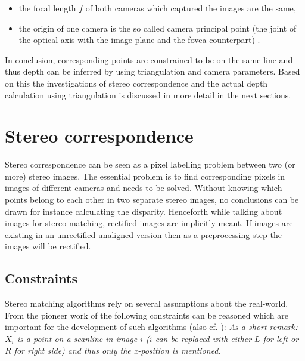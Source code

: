 \begin{itemize}
  \item the focal length $f$ of both cameras which captured the images are the same,
  \item the origin of one camera is the so called camera principal point (the joint of the optical axis with the image plane and the fovea counterpart) \citep{cyganek2011introduction}.
\end{itemize}

\noindent In conclusion, corresponding points are constrained to be on the same line and thus depth can be inferred by using triangulation and camera parameters.
Based on this the investigations of stereo correspondence and the actual depth calculation using triangulation is discussed in more detail in the next sections.

\section{Stereo correspondence}

Stereo correspondence can be seen as a pixel labelling problem \citep{wanner2013reconstructing, cyganek2011introduction} between two (or more) stereo images.
The essential problem is to find corresponding pixels in images of different cameras and needs to be solved.
Without knowing which points belong to each other in two separate stereo images, no conclusions can be drawn for instance calculating the disparity.
Henceforth while talking about images for stereo matching, rectified images are implicitly meant.
If images are existing in an unrectified unaligned version then as a preprocessing step the images will be rectified.

\subsection*{Constraints}

Stereo matching algorithms rely on several assumptions about the real-world.
From the pioneer work of \citeauthor{marr1976cooperative} \citep{marr1976cooperative} the following constraints can be reasoned which are important for the development of such algorithms (also cf. \citep{cyganek2011introduction, wanner2013reconstructing,kack2004robust}):
\newline\newline\noindent \textit{As a short remark: $X_i$ is a point on a scanline in image $i$ ($i$ can be replaced with either $L$ for left or $R$ for right side) and thus only the x-position is mentioned.}

